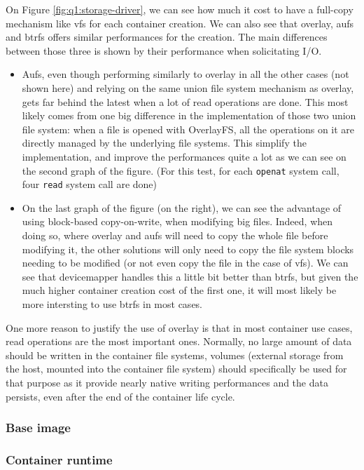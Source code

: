 On Figure \ref{fig:q1:storage-driver}, we can see how much it cost to have a full-copy mechanism like vfs for each container creation.  We can also see that overlay, aufs and btrfs offers similar performances for the creation.  The main differences between those three is shown by their performance when solicitating I/O.  
\begin{itemize}
  \item Aufs, even though performing similarly to overlay in all the other cases (not shown here) and relying on the same union file system mechanism as overlay, gets far behind the latest when a lot of read operations are done.  This most likely comes from one big difference in the implementation of those two union file system: when a file is opened with OverlayFS, all the operations on it are directly managed by the underlying file systems.  This simplify the implementation, and improve the performances quite a lot as we can see on the second graph of the figure.  (For this test, for each \texttt{openat} system call, four \texttt{read} system call are done)
  \item On the last graph of the figure (on the right), we can see the advantage of using block-based copy-on-write, when modifying big files.  Indeed, when doing so, where overlay and aufs will need to copy the whole file before modifying it, the other solutions will only need to copy the file system blocks needing to be modified (or not even copy the file in the case of vfs).  We can see that devicemapper handles this a little bit better than btrfs, but given the much higher container creation cost of the first one, it will most likely be more intersting to use btrfs in most cases.
\end{itemize}
One more reason to justify the use of overlay is that in most container use cases, read operations are the most important ones.  Normally, no large amount of data should be written in the container file systems, volumes (external storage from the host, mounted into the container file system) should specifically be used for that purpose as it provide nearly native writing performances and the data persists, even after the end of the container life cycle.

\subsubsection{Base image}

\subsubsection{Container runtime}

